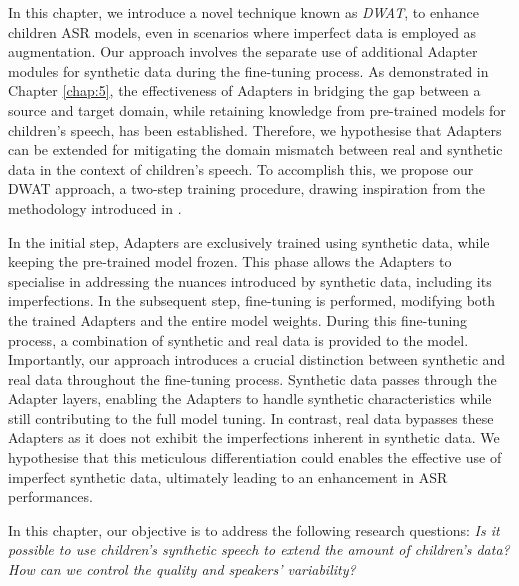 In this chapter, we introduce a novel technique known as \textit{\ac{DWAT}}, to enhance children \ac{ASR} models, even in scenarios where imperfect data is employed as augmentation. Our approach involves the separate use of additional Adapter modules for synthetic data during the fine-tuning process. As demonstrated in Chapter \ref{chap:5}, the effectiveness of Adapters in bridging the gap between a source and target domain, while retaining knowledge from pre-trained models for children's speech, has been established. Therefore, we hypothesise that Adapters can be extended for mitigating the domain mismatch between real and synthetic data in the context of children's speech. To accomplish this, we propose our \ac{DWAT} approach, a two-step training procedure, drawing inspiration from the methodology introduced in \cite{fan2022draft}.


In the initial step, Adapters are exclusively trained using synthetic data, while keeping the pre-trained model frozen. This phase allows the Adapters to specialise in addressing the nuances introduced by synthetic data, including its imperfections. In the subsequent step, fine-tuning is performed, modifying both the trained Adapters and the entire model weights. During this fine-tuning process, a combination of synthetic and real data is provided to the model. Importantly, our approach introduces a crucial distinction between synthetic and real data throughout the fine-tuning process. Synthetic data passes through the Adapter layers, enabling the Adapters to handle synthetic characteristics while still contributing to the full model tuning. In contrast, real data bypasses these Adapters as it does not exhibit the imperfections inherent in synthetic data. We hypothesise that this meticulous differentiation could enables the effective use of imperfect synthetic data, ultimately leading to an enhancement in \ac{ASR} performances.


In this chapter, our objective is to address the following research questions: \textit{Is it possible to use children's synthetic speech to extend the amount of children's data? How can we control the quality and speakers’ variability?}

